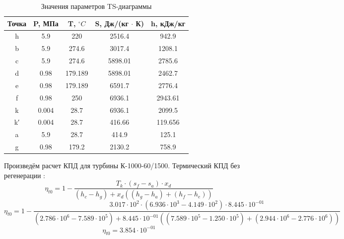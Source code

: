 \begin{table}[H]
	\caption{Значения параметров TS-диаграммы}
	\begin{center}
        \begin{tabular}{|c|c|c|c|c|}
        \toprule
         Точка & P, МПа & T, $^\circ C$ & S, Дж/(кг $\cdot$ К) & h, кДж/кг \\ 
         \midrule
         \hline
          h & 5.9 & 220 & 2516.4 & 942.9\\ 
         \hline
          b & 5.9 & 274.6 & 3017.4 & 1208.1 \\ 
         \hline
          c & 5.9 & 274.6 & 5898.01 & 2785.6\\ 
         \hline
          d & 0.98 & 179.189 & 5898.01 & 2462.7 \\ 
         \hline
          e & 0.98 & 179.189 & 6591.7 & 2776.4 \\ 
         \hline
          f & 0.98 & 250  & 6936.1 & 2943.61 \\ 
         \hline
          k & 0.004 & 28.7 & 6936.1 & 2099.5 \\ 
         \hline
          k′ & 0.004 & 28.7 & 416.66 & 119.656 \\ 
         \hline
          a & 5.9  & 28.7 & 414.9 & 125.1 \\ 
         \hline
          g & 0.98 & 179.2 & 2130.2 & 758.9 \\ 
         \bottomrule
		\end{tabular}
		\label{tabular:coeffs}
	\end{center}
\end{table}

Произведём расчет КПД для турбины К-1000-60/1500. Термический КПД без регенерации \cite{КирилловСправочник}:
\begin{equation}
\eta_{t0}=1 - 
\frac{T_{k} ⋅ \left( s_{f} - s_{a} \right) ⋅ x_{d}}
{\left( h_{c} - h_{g} \right) +x_{d}\left( \left( h_{g} - h_{a} \right) + \left( h_{f} - h_{e} \right) \right)}
\end{equation}
\begin{equation}
\eta_{t0} = 
1 - 
\frac{3.017 \cdot 10^{ 2 } ⋅ \left( 6.936 \cdot 10^{ 3 } - 4.149 \cdot 10^{ 2 } \right) ⋅ 8.445 \cdot 10^{ -01 }}
{\left( 2.786 \cdot 10^{ 6 } - 7.589 \cdot 10^{ 5 } \right) + 8.445 \cdot 10^{ -01 } \left( \left( 7.589 \cdot 10^{ 5 } - 1.250 \cdot 10^{ 5 } \right) + \left( 2.944 \cdot 10^{ 6 } - 2.776 \cdot 10^{ 6 } \right) \right)}
\end{equation}
\begin{equation}
\eta_{t0}=3.854 \cdot 10^{ -01 }
\end{equation}

